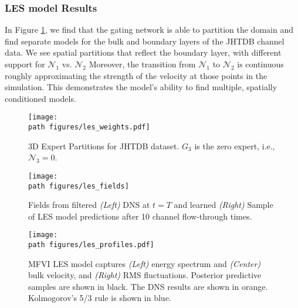 \subsubsection{LES model Results}

In Figure \ref{fig:les_expert_partitions}, we find that the gating network is able to  partition the domain and find separate models for the bulk and boundary layers of the JHTDB channel data. We see spatial partitions that reflect the boundary layer, with different support for $\mathcal{N}_1$ vs. $\mathcal{N}_2$ Moreover, the transition from \(\mathcal{N}_1\) to \(\mathcal{N}_2\) is continuous roughly approximating the strength of the velocity at those points in the simulation. This demonstrates the model's ability to find multiple, spatially conditioned models.
\begin{figure}[H]
    \centering
    \texttt{[image: \\path figures/les\_weights.pdf]}
    \caption{3D Expert Partitions for JHTDB dataset. $G_3$ is the zero expert, i.e., $\mathcal{N}_3 = 0$.}
    \label{fig:les_expert_partitions}
\end{figure}



\begin{figure}[H]
    \centering
    \texttt{[image: \\path figures/les\_fields]}
    \caption{Fields from filtered \textit{(Left)} DNS at $t=T$ and learned  \textit{(Right)} Sample of LES model predictions after 10 channel flow-through times.}
    \label{fig:Qcrit}
\end{figure}


\begin{figure}[H]
    \centering
    \texttt{[image: \\path figures/les\_profiles.pdf]}
    \caption{MFVI LES model captures \textit{(Left)} energy spectrum and \textit{(Center)} bulk velocity, and \textit{(Right)} RMS fluctuations. Posterior predictive samples are shown in black. The DNS results are shown in orange. Kolmogorov's 5/3 rule is shown in blue.}
    \label{fig:Energy_Spectrum}
\end{figure}

